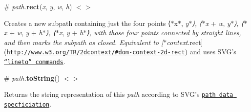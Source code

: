 \label{_path_rect}%
\# {\itshape path}.{\bfseries rect}({\itshape x}, {\itshape y}, {\itshape w}, {\itshape h}) \href{https://github.com/d3/d3-path/blob/master/src/path.js#L122}{\tt $<$$>$}

Creates a new subpath containing just the four points ⟨$\ast$x$\ast$, {\itshape y$\ast$⟩, ⟨$\ast$x} + {\itshape w}, {\itshape y$\ast$⟩, ⟨$\ast$x} + {\itshape w}, {\itshape y} + {\itshape h$\ast$⟩, ⟨$\ast$x}, {\itshape y} + {\itshape h$\ast$⟩, with those four points connected by straight lines, and then marks the subpath as closed. Equivalent to \mbox{[}$\ast$context}.rect\mbox{]}(\href{http://www.w3.org/TR/2dcontext/#dom-context-2d-rect}{\tt http\+://www.\+w3.\+org/\+T\+R/2dcontext/\#dom-\/context-\/2d-\/rect}) and uses S\+V\+G’s \href{http://www.w3.org/TR/SVG/paths.html#PathDataLinetoCommands}{\tt “lineto” commands}.

\label{_path_toString}%
\# {\itshape path}.{\bfseries to\+String}() \href{https://github.com/d3/d3-path/blob/master/src/path.js#L125}{\tt $<$$>$}

Returns the string representation of this {\itshape path} according to S\+V\+G’s \href{http://www.w3.org/TR/SVG/paths.html#PathData}{\tt path data specficiation}. 